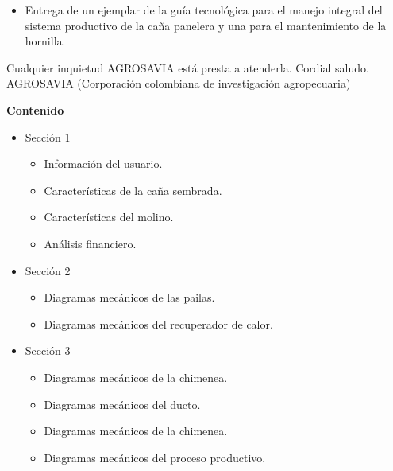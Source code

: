 \documentclass{article}%
\begin{document}
\begin{large}
\begin{itemize}
\item%
Entrega de un ejemplar de la guía tecnológica para el manejo integral del sistema productivo de la caña panelera y una para el mantenimiento de la hornilla.%
\end{itemize}%
Cualquier inquietud AGROSAVIA está presta a atenderla.\newline%
Cordial saludo.\newline%
\newline%
 \newline%
 \newline%
 \newline%
AGROSAVIA (Corporación colombiana de investigación agropecuaria)%
\end{large}%
\newpage%
\begin{large}%
\begin{Large}%
\textbf{Contenido}%
\end{Large}%
\begin{itemize}%
\item%
Sección 1%
\begin{itemize}%
\item%
Información del usuario.%
\item%
Características de la caña sembrada.%
\item%
Características del molino.%
\item%
Análisis financiero.%
\end{itemize}%
\item%
Sección 2%
\begin{itemize}%
\item%
Diagramas mecánicos de las pailas.%
\item%
Diagramas mecánicos del recuperador de calor.%
\end{itemize}%
\item%
Sección 3%
\begin{itemize}%
\item%
Diagramas mecánicos de la chimenea.%
\item%
Diagramas mecánicos del ducto.%
\item%
Diagramas mecánicos de la chimenea.%
\item%
Diagramas mecánicos del proceso productivo.%
\end{itemize}%
\end{itemize}%
\end{large}%
\newpage%
\end{document}
